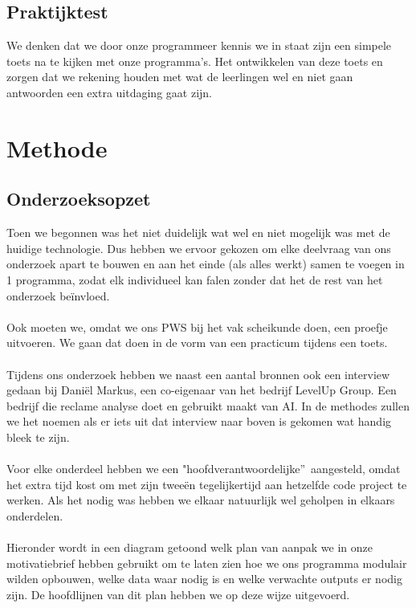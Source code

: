 \documentclass[12pt]{article}
\begin{document}
\begin{multicols}{2}
\subsection{Praktijktest}
We denken dat we door onze programmeer kennis we in staat zijn een simpele toets na te kijken met onze programma's. Het ontwikkelen van deze toets en zorgen dat we rekening houden met wat de leerlingen wel en niet gaan antwoorden een extra uitdaging gaat zijn.
\end{multicols}
\pagebreak

\section{Methode}
\subsection{Onderzoeksopzet}
\begin{multicols}{2}
Toen we begonnen was het niet duidelijk wat wel en niet mogelijk was met de huidige technologie. Dus hebben we ervoor gekozen om elke deelvraag van ons onderzoek apart te bouwen en aan het einde (als alles werkt) samen te voegen in 1 programma, zodat elk individueel kan falen zonder dat het de rest van het onderzoek beïnvloed.
\\\\
Ook moeten we, omdat we ons PWS bij het vak scheikunde doen, een proefje uitvoeren. We gaan dat doen in de vorm van een practicum tijdens een toets.
\\\\
Tijdens ons onderzoek hebben we naast een aantal bronnen ook een interview gedaan bij Daniël Markus, een co-eigenaar van het bedrijf LevelUp Group. Een bedrijf die reclame analyse doet en gebruikt maakt van AI. In de methodes zullen we het noemen als er iets uit dat interview naar boven is gekomen wat handig bleek te zijn.
\\\\
Voor elke onderdeel hebben we een "hoofdverantwoordelijke\textquotedblright \  aangesteld, omdat het extra tijd kost om met zijn tweeën tegelijkertijd aan hetzelfde code project te werken. Als het nodig was hebben we elkaar natuurlijk wel geholpen in elkaars onderdelen. 
\\\\
Hieronder wordt in een diagram getoond welk plan van aanpak we in onze motivatiebrief hebben gebruikt om te laten zien hoe we ons programma modulair wilden opbouwen, welke data waar nodig is en welke verwachte outputs er nodig zijn. De hoofdlijnen van dit plan hebben we op deze wijze uitgevoerd.
\end{multicols}
\end{document}
